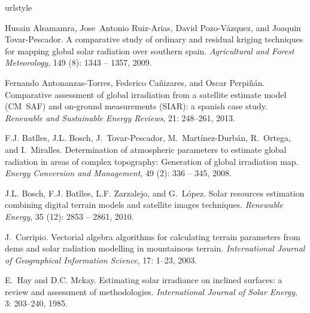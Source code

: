 \documentclass[11pt, english]{article}
\begin{document}
\begin{thebibliography}{20}
\providecommand{\natexlab}[1]{#1}
\providecommand{\url}[1]{\texttt{#1}}
\expandafter\ifx\csname urlstyle\endcsname\relax
  \providecommand{\doi}[1]{doi: #1}\else
  \providecommand{\doi}{doi: \begingroup \urlstyle{rm}\Url}\fi

Husain Alsamamra, Jose~Antonio Ruiz-Arias, David Pozo-Vázquez, and Joaquin
  Tovar-Pescador.
\newblock A comparative study of ordinary and residual kriging techniques for
  mapping global solar radiation over southern spain.
\newblock \emph{Agricultural and Forest Meteorology}, 149
  (8): 1343 -- 1357, 2009.

Fernando Antonanzas-Torres, Federico Cañizares, and Oscar Perpiñán.
\newblock Comparative assessment of global irradiation from a satellite
  estimate model ({CM~SAF}) and on-ground measurements ({SIAR}): a spanish case
  study.
\newblock \emph{Renewable and Sustainable Energy Reviews}, 21:
  248--261, 2013.

F.J. Batlles, J.L. Bosch, J.~Tovar-Pescador, M.~Martínez-Durbán, R.~Ortega,
  and I.~Miralles.
\newblock Determination of atmospheric parameters to estimate global radiation
  in areas of complex topography: Generation of global irradiation map.
\newblock \emph{Energy Conversion and Management}, 49 (2):
  336 -- 345, 2008.

J.L. Bosch, F.J. Batlles, L.F. Zarzalejo, and G.~López.
\newblock Solar resources estimation combining digital terrain models and
  satellite images techniques.
\newblock \emph{Renewable Energy}, 35 (12): 2853 -- 2861,
  2010.

J.~Corripio.
\newblock Vectorial algebra algorithms for calculating terrain parameters from
  dems and solar radiation modelling in mountainous terrain.
\newblock \emph{International Journal of Geographical Information Science},
  17: 1--23, 2003.

E.~Hay and D.C. Mckay.
\newblock Estimating solar irradiance on inclined surfaces: a review and
  assessment of methodologies.
\newblock \emph{International Journal of Solar Energy}, 3: 203--240,
  1985.


\end{thebibliography}
\end{document}
